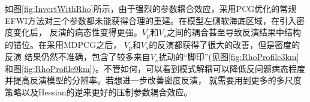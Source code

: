 如图\ref{fig:InvertWithRho}所示，由于强烈的参数耦合效应，采用PCG优化的常规EFWI方法对三个参数都未能获得合理的重建。在模型左侧软海底区域，在引入密度变化后，
反演的病态性变得更强。$V_p$和$V_s$之间的耦合甚至导致反演结果中结构的错位。在采用MDPCG之后， $V_p$和$V_s$的反演都获得了很大的改善，但是密度的反演
结果仍然不准确，包含了较多来自$V_s$扰动的“脚印”(见图\ref{fig:RhoProfile3km}和图\ref{fig:RhoProfile9km})。不管如何，可以看到模式解耦可以降低反问题病态程度并提高反演模型的分辨率。若想进一步改善密度反演，
就需要用到更多的多尺度策略以及Hessian的逆来更好的压制参数耦合效应。
\begin{figure}
    \begin{center}
        \\
        \\

\end{center}
\end{figure}
